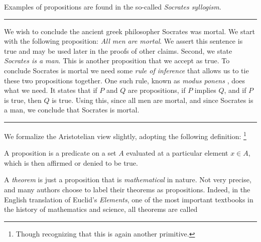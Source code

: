             Examples of propositions are found in the so-called
            \textit{Socrates syllogism}.
            \par\hfill\par\hrule
            \begin{example}
                We wish to conclude the ancient greek philosopher
                Socrates was mortal. We start with the
                following proposition: \textit{All men are mortal}. We assert
                this sentence is true and may be used later in the proofs of
                other claims. Second, we state \textit{Socrates is a man}.
                This is another proposition that we accept as true. To conclude
                Socrates is mortal we need some \textit{rule of inference} that
                allows us to tie these two propositions together. One such
                rule, known as \textit{modus ponens}%
                , does what we need. It states
                that if $P$ and $Q$ are propositions, if $P$ implies $Q$, and
                if $P$ is true, then $Q$ is true. Using this, since all men are
                mortal, and since Socrates is a man, we conclude that Socrates
                is mortal.
            \end{example}
            \hrule\par\hfill\par
            We formalize the Aristotelian view slightly, adopting the
            following definition:%
            \footnote{%
                Though recognizing that this is again another primitive.
            }
            \begin{definition}
                \label{def:Proposition}%
                A \gls{proposition} is a \gls{predicate} on a \gls{set} $A$
                evaluated at a particular element $x\in{A}$, which is then
                affirmed or denied to be true.%
            \end{definition}
            A \textit{theorem} is just
            a proposition that is \textit{mathematical} in nature. Not very
            precise, and many authors choose to label their theorems as
            propositions. Indeed, in the English translation of Euclid's
            \textit{Elements}, one of the most important textbooks in the
            history of mathematics and science, all theorems are called
